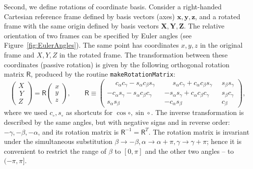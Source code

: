\documentclass[12pt]{article}
\newcommand{\bx}{\boldsymbol{x}}
\newcommand{\by}{\boldsymbol{y}}
\newcommand{\bz}{\boldsymbol{z}}
\newcommand{\bX}{\boldsymbol{X}}
\newcommand{\bY}{\boldsymbol{Y}}
\newcommand{\bZ}{\boldsymbol{Z}}
\begin{document}
Second, we define rotations of coordinate basis.
Consider a right-handed Cartesian reference frame defined by basis vectors (axes) $\bx,\by,\bz$, and a rotated frame with the same origin defined by basis vectors $\bX,\bY,\bZ$. The relative orientation of two frames can be specified by Euler angles (see Figure~\ref{fig:EulerAngles}).
The same point has coordinates $x,y,z$ in the original frame and $X,Y,Z$ in the rotated frame.
The transformation between these coordinates (passive rotation) is given by the following orthogonal rotation matrix $\mathsf R$, produced by the routine \texttt{makeRotationMatrix}:
\begin{equation}
\left( \begin{array}{c} X \\ \,Y \\ Z \end{array} \right) = \mathsf R 
\left( \begin{array}{c} x \\   y \\ z \end{array} \right) , \qquad
\mathsf R \equiv \left( \begin{array}{ccc}  \phantom{-}
 c_\alpha c_\gamma - s_\alpha c_\beta s_\gamma\;\; & \phantom{-}
 s_\alpha c_\gamma + c_\alpha c_\beta s_\gamma\;\; &
 s_\beta  s_\gamma \\
-c_\alpha s_\gamma - s_\alpha c_\beta c_\gamma\;\; &
-s_\alpha s_\gamma + c_\alpha c_\beta c_\gamma\;\; &
 s_\beta  c_\gamma \\
 s_\alpha s_\beta &
-c_\alpha s_\beta &
 c_\beta 
\end{array} \right) ,
\end{equation}
where we used $c_\circ, s_\circ$ as shortcuts for $\cos\circ, \sin\circ$.
The inverse transformation is described by the same angles, but with negative signs and in reverse order: $-\gamma,-\beta,-\alpha$, and its rotation matrix is $\mathsf R^{-1} = \mathsf R^T$. 
The rotation matrix is invariant under the simultaneous substitution $\beta \to -\beta, \alpha \to \alpha+\pi, \gamma \to \gamma+\pi$; hence it is convenient to restrict the range of $\beta$ to $[0,\pi]$ and the other two angles -- to $(-\pi,\pi]$.\\
\end{document}
